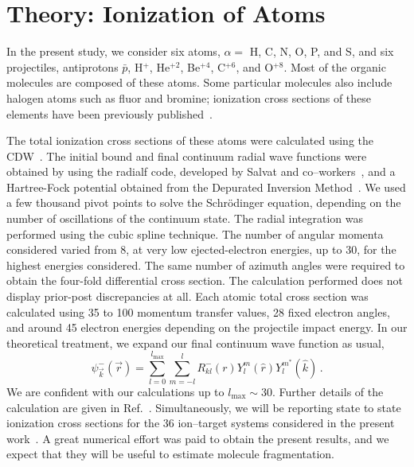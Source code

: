 \documentclass[preprint]{revtex4-2}
\begin{document}
\section{Theory: Ionization of Atoms}

In the present study, we consider six atoms, $\alpha=$ H, C, N, O, P, 
and S, and six projectiles, antiprotons $\bar{p}$, H$^{+}$, He$^{+2}$, 
Be$^{+4}$, C$^{+6}$, and O$^{+8}$. 
Most of the organic molecules are composed of these atoms. Some 
particular molecules also include halogen atoms such as fluor and 
bromine; ionization cross sections of these elements have been 
previously published~\cite{miraglia2008}.

The total ionization cross sections of these atoms were calculated using 
the CDW~\cite{miraglia2008,fainstein1988,miraglia2009}. The initial bound and final continuum radial wave 
functions were obtained by using the {\sc radialf} code, developed by 
Salvat and co--workers~\cite{salvat1995}, and a Hartree-Fock potential 
obtained from the Depurated Inversion Method~\cite{mendez2016,mendez2018}. 
We used a few thousand pivot points to solve the Schr\"{o}dinger 
equation, depending on the number of oscillations of the continuum 
state. The radial integration was performed using the cubic spline 
technique. The number of angular momenta considered varied from 8, at 
very low ejected-electron energies, up to 30, for the highest energies 
considered. The same number of azimuth angles were required to obtain 
the four-fold differential cross section. The calculation performed does 
not display prior-post discrepancies at all. Each atomic total cross 
section was calculated using 35 to 100 momentum transfer values, 28 
fixed electron angles, and around 45 electron energies depending on the 
projectile impact energy. In our theoretical treatment, we expand our 
final continuum wave function as usual,
\begin{equation}
\psi_{\overrightarrow{k}}^{-}(\overrightarrow{r})=\sum_{l=0}^{l_{\max
}}\sum_{m=-l}^{l}R_{kl}^{-}(r)Y_{l}^{m}(\widehat{r})Y_{l}^{m^{\ast }}
(\widehat{k})\,.
\label{eq:contwave}
\end{equation}
We are confident with our calculations up to $l_{\max}\sim 30$. Further 
details of the calculation are given in Ref.~\cite{montanari2017}. 
Simultaneously, we will be reporting state to state ionization cross 
sections for the 36 ion--target systems considered in the present 
work~\cite{miraglia2019}. A great numerical effort was paid to obtain 
the present results, and we expect that they will be useful to estimate 
molecule fragmentation.
\end{document}
